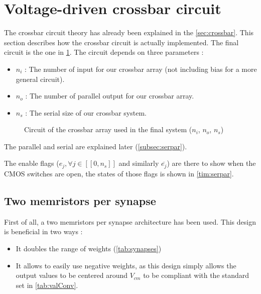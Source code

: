 \section{Voltage-driven crossbar circuit}
\label{sec:xbarCircuit}

The crossbar circuit theory has already been explained in the \cref{sec:crossbar}. This section describes how the crossbar circuit is actually implemented. The final circuit is the one in \cref{circt:xbar}. The circuit depends on three parameters :

\begin{itemize}
  \item $n_i$ : The number of input for our crossbar array (not including bias for a more general circuit).
  \item $n_o$ : The number of parallel output for our crossbar array.
  \item $n_s$ : The serial size of our crossbar system.
\end{itemize}

\begin{figure}[H]
  \centering
  
  \caption{Circuit of the crossbar array used in the final system ($n_i$, $n_o$, $n_s$)}
  \label{circt:xbar}
\end{figure}

The parallel and serial are explained later (\cref{subsec:serpar}).

The enable flags ($e_j,\forall j\in[\![ 0,n_s]\!]$ and similarly $\overline{e_j}$) are there to show when the \ac{CMOS} switches are open, the states of those flags is shown in \cref{tim:serpar}.

\subsection{Two memristors per synapse}
\label{subsec:doubleMem}

First of all, a two memristors per synapse architecture has been used. This design is beneficial in two ways :

\begin{itemize}
  \item It doubles the range of weights (\cref{tab:synapses})
  \item It allows to easily use negative weights, as this design simply allows the output values to be centered around $V_{cm}$ to be compliant with the standard set in \cref{tab:valConv}.
\end{itemize}

